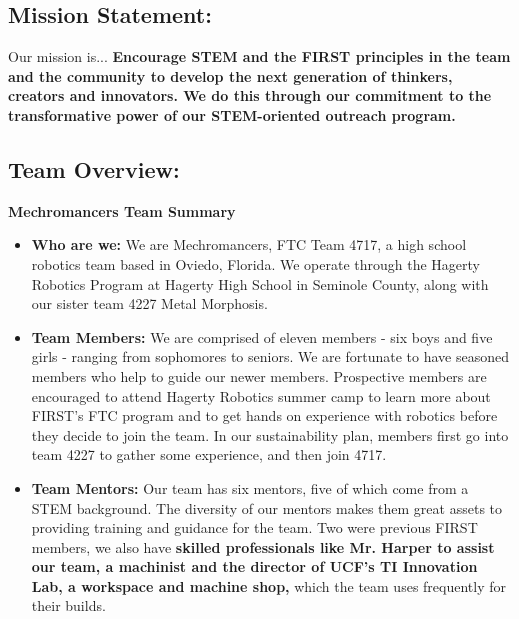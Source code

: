 \subsection*{\textbf{\Huge Mission Statement:}}
\vspace{.2cm}
\setlength{\parindent}{.25in} 

\large{Our mission is...}
\newline 
\textbf{Encourage STEM and the FIRST principles in the team and the community to develop the next generation of thinkers, creators and innovators. We do this through our commitment to the transformative power of our STEM-oriented outreach program.}

\subsection*{\textbf{\Huge Team Overview:}}
\vspace{.2cm}
\setlength{\parindent}{.25in} 

\textbf{\Large Mechromancers Team Summary}

\begin{itemize}
 \item \textbf{Who are we:} We are Mechromancers, FTC Team 4717, a high school robotics team based in Oviedo, Florida. We operate through the Hagerty Robotics Program at Hagerty High School in Seminole County, along with our sister team 4227 Metal Morphosis.
 \item \textbf{Team Members:}  We are comprised of eleven members -  six boys and five girls - ranging from sophomores to seniors. We are fortunate to have seasoned members who help to guide our newer members. Prospective members are encouraged to attend Hagerty Robotics summer camp to learn more about FIRST’s FTC program and to get hands on experience with robotics before they decide to join the team. In our sustainability plan, members first go into team 4227 to gather some experience, and then join 4717.
 \item \textbf{Team Mentors:} Our team has six mentors, five of which come from a STEM background. The diversity of our mentors makes them great assets to providing training and guidance for the team. Two were previous FIRST members, we also have \textbf{skilled professionals like Mr. Harper to assist our team, a machinist and the director of UCF's TI Innovation Lab, a workspace and machine shop,} which the team uses frequently for their builds.
\end{itemize}

